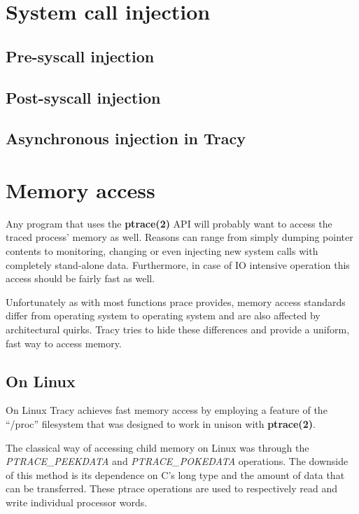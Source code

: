 \documentclass[a4paper, twoside, 10pt]{report}
\begin{document}
\section{System call injection}


\subsection{Pre-syscall injection}

\subsection{Post-syscall injection}

\subsection{Asynchronous injection in Tracy}

\section{Memory access}

Any program that uses the \textbf{ptrace(2)} API will probably want to access the
traced process' memory as well. Reasons can range from simply dumping pointer
contents to monitoring, changing or even injecting new system calls with
completely stand-alone data. Furthermore, in case of IO intensive operation
this access should be fairly fast as well.

Unfortunately as with most functions prace provides, memory access standards
differ from operating system to operating system and are also
affected by architectural quirks. Tracy tries to hide these differences and
provide a uniform, fast way to access memory.

\subsection{On Linux}
On Linux Tracy achieves fast memory access by employing a feature of the
``/proc'' filesystem that was designed to work in unison with
\textbf{ptrace(2)}.

The classical way of accessing child memory on Linux was through the
\textit{PTRACE\_PEEKDATA} and \textit{PTRACE\_POKEDATA} operations.
The downside of this method is its dependence on C's long type and the
amount of data that can be transferred.
These ptrace operations are used to respectively read and write individual
processor words.
\end{document}
